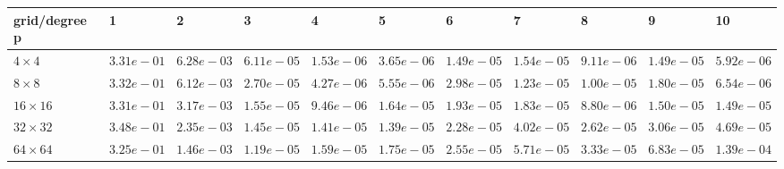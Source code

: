 \begin{tabular}{lllllllllll}
\hline
 grid/degree p   & 1          & 2          & 3          & 4          & 5          & 6          & 7          & 8          & 9          & 10         \\
\hline
 $4 \times 4$    & $3.31e-01$ & $6.28e-03$ & $6.11e-05$ & $1.53e-06$ & $3.65e-06$ & $1.49e-05$ & $1.54e-05$ & $9.11e-06$ & $1.49e-05$ & $5.92e-06$ \\
 $8 \times 8$    & $3.32e-01$ & $6.12e-03$ & $2.70e-05$ & $4.27e-06$ & $5.55e-06$ & $2.98e-05$ & $1.23e-05$ & $1.00e-05$ & $1.80e-05$ & $6.54e-06$ \\
 $16 \times 16$  & $3.31e-01$ & $3.17e-03$ & $1.55e-05$ & $9.46e-06$ & $1.64e-05$ & $1.93e-05$ & $1.83e-05$ & $8.80e-06$ & $1.50e-05$ & $1.49e-05$ \\
 $32 \times 32$  & $3.48e-01$ & $2.35e-03$ & $1.45e-05$ & $1.41e-05$ & $1.39e-05$ & $2.28e-05$ & $4.02e-05$ & $2.62e-05$ & $3.06e-05$ & $4.69e-05$ \\
 $64 \times 64$  & $3.25e-01$ & $1.46e-03$ & $1.19e-05$ & $1.59e-05$ & $1.75e-05$ & $2.55e-05$ & $5.71e-05$ & $3.33e-05$ & $6.83e-05$ & $1.39e-04$ \\
\hline
\end{tabular}